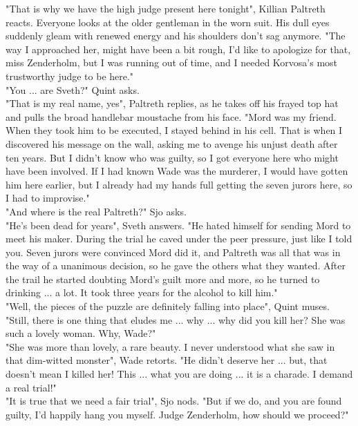 "That is why we have the high judge present here tonight", Killian Paltreth reacts. Everyone looks at the older gentleman in the worn suit. His dull eyes suddenly gleam with renewed energy and his shoulders don't sag anymore. "The way I approached her, might have been a bit rough, I'd like to apologize for that, miss Zenderholm, but I was running out of time, and I needed Korvosa's most trustworthy judge to be here."\\

"You ... are Sveth?" Quint asks.\\

"That is my real name, yes", Paltreth replies, as he takes off his frayed top hat and pulls the broad handlebar moustache from his face. "Mord was my friend. When they took him to be executed, I stayed behind in his cell. That is when I discovered his message on the wall, asking me to avenge his unjust death after ten years. But I didn't know who was guilty, so I got everyone here who might have been involved. If I had known Wade was the murderer, I would have gotten him here earlier, but I already had my hands full getting the seven jurors here, so I had to improvise."\\

"And where is the real Paltreth?" Sjo asks.\\

"He's been dead for years", Sveth answers. "He hated himself for sending Mord to meet his maker. During the trial he caved under the peer pressure, just like I told you. Seven jurors were convinced Mord did it, and Paltreth was all that was in the way of a unanimous decision, so he gave the others what they wanted. After the trail he started doubting Mord's guilt more and more, so he turned to drinking ... a lot. It took three years for the alcohol to kill him."\\

"Well, the pieces of the puzzle are definitely falling into place", Quint muses. "Still, there is one thing that eludes me ... why ... why did you kill her? She was such a lovely woman. Why, Wade?"\\

"She was more than lovely, a rare beauty. I never understood what she saw in that dim-witted monster", Wade retorts. "He didn't deserve her ... but, that doesn't mean I killed her! This ... what you are doing ... it is a charade. I demand a real trial!"\\

"It is true that we need a fair trial", Sjo nods. "But if we do, and you are found guilty, I'd happily hang you myself. Judge Zenderholm, how should we proceed?"\\

